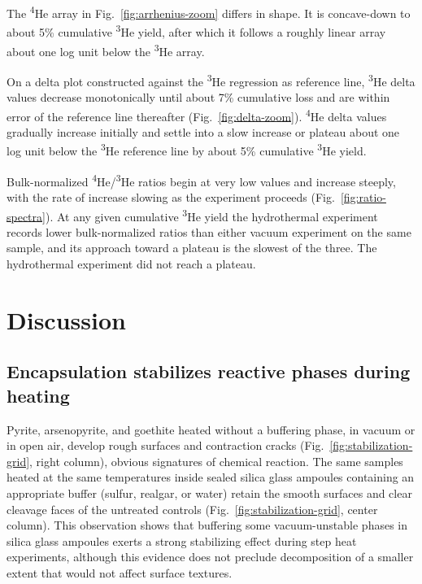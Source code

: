 The \textsuperscript{4}He array in Fig.~\ref{fig:arrhenius-zoom} differs in shape. It is concave-down to about 5\% cumulative \textsuperscript{3}He yield, after which it follows a roughly linear array about one log unit below the \textsuperscript{3}He array.

On a delta plot constructed against the \textsuperscript{3}He regression as reference line, \textsuperscript{3}He delta values decrease monotonically until about 7\% cumulative loss and are within error of the reference line thereafter (Fig.~\ref{fig:delta-zoom}). \textsuperscript{4}He delta values gradually increase initially and settle into a slow increase or plateau about one log unit below the \textsuperscript{3}He reference line by about 5\% cumulative \textsuperscript{3}He yield. 

Bulk-normalized \textsuperscript{4}He/\textsuperscript{3}He ratios begin at very low values and increase steeply, with the rate of increase slowing as the experiment proceeds (Fig.~\ref{fig:ratio-spectra}). At any given cumulative \textsuperscript{3}He yield the hydrothermal experiment records lower bulk-normalized ratios than either vacuum experiment on the same sample, and its approach toward a plateau is the slowest of the three. The hydrothermal experiment did not reach a plateau. 

\section{Discussion}\label{sec:discussion}

\subsection{Encapsulation stabilizes reactive phases during heating}\label{sec:results-stabilization}

Pyrite, arsenopyrite, and goethite heated without a buffering phase, in vacuum or in open air, develop rough surfaces and contraction cracks (Fig.~\ref{fig:stabilization-grid}, right column), obvious signatures of chemical reaction. The same samples heated at the same temperatures inside sealed silica glass ampoules containing an appropriate buffer (sulfur, realgar, or water) retain the smooth surfaces and clear cleavage faces of the untreated controls (Fig.~\ref{fig:stabilization-grid}, center column). This observation shows that buffering some vacuum-unstable phases in silica glass ampoules exerts a strong stabilizing effect during step heat experiments, although this evidence does not preclude decomposition of a smaller extent that would not affect surface textures. 

